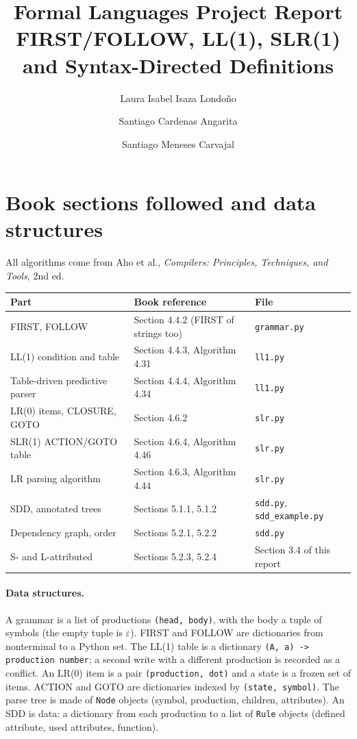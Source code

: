 \documentclass[11pt]{article}
\title{Formal Languages Project Report\\FIRST/FOLLOW, LL(1), SLR(1) and Syntax-Directed Definitions}
\author{Laura Isabel Isaza Londo\~no \and Santiago Cardenas Angarita \and Santiago Meneses Carvajal}
\date{}
\begin{document}
\maketitle

\section{Book sections followed and data structures}
All algorithms come from Aho et al., \emph{Compilers: Principles, Techniques, and Tools}, 2nd ed.
\begin{center}
\begin{tabular}{p{4.6cm}p{5.6cm}p{5cm}}
\toprule
Part & Book reference & File\\
\midrule
FIRST, FOLLOW & Section 4.4.2 (FIRST of strings too) & \texttt{grammar.py}\\
LL(1) condition and table & Section 4.4.3, Algorithm 4.31 & \texttt{ll1.py}\\
Table-driven predictive parser & Section 4.4.4, Algorithm 4.34 & \texttt{ll1.py}\\
LR(0) items, CLOSURE, GOTO & Section 4.6.2 & \texttt{slr.py}\\
SLR(1) ACTION/GOTO table & Section 4.6.4, Algorithm 4.46 & \texttt{slr.py}\\
LR parsing algorithm & Section 4.6.3, Algorithm 4.44 & \texttt{slr.py}\\
SDD, annotated trees & Sections 5.1.1, 5.1.2 & \texttt{sdd.py}, \texttt{sdd\_example.py}\\
Dependency graph, order & Sections 5.2.1, 5.2.2 & \texttt{sdd.py}\\
S- and L-attributed & Sections 5.2.3, 5.2.4 & Section 3.4 of this report\\
\bottomrule
\end{tabular}
\end{center}

\paragraph{Data structures.}
A grammar is a list of productions \texttt{(head, body)}, with the body a tuple of symbols
(the empty tuple is $\varepsilon$). FIRST and FOLLOW are dictionaries from nonterminal to a Python set.
The LL(1) table is a dictionary \texttt{(A, a) -> production number}; a second write with a different
production is recorded as a conflict. An LR(0) item is a pair \texttt{(production, dot)} and a state is a
frozen set of items. ACTION and GOTO are dictionaries indexed by \texttt{(state, symbol)}. The parse tree is made
of \texttt{Node} objects (symbol, production, children, attributes). An SDD is data: a dictionary from each
production to a list of \texttt{Rule} objects (defined attribute, used attributes, function).
\end{document}
